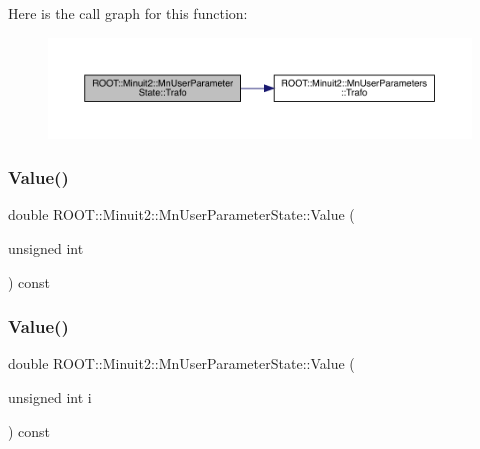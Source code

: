 Here is the call graph for this function\+:
\nopagebreak
\begin{figure}[H]
\begin{center}
\leavevmode
\includegraphics[width=350pt]{d3/de0/classROOT_1_1Minuit2_1_1MnUserParameterState_a7184e94a20e923d68f1fb00ab5c549b2_cgraph}
\end{center}
\end{figure}
\mbox{\label{classROOT_1_1Minuit2_1_1MnUserParameterState_a0f977953363899fd9ee8933b879cde3e}} 
\subsubsection{\texorpdfstring{Value()}{Value()}\hspace{0.1cm}{\footnotesize\ttfamily [1/4]}}
{\footnotesize\ttfamily double R\+O\+O\+T\+::\+Minuit2\+::\+Mn\+User\+Parameter\+State\+::\+Value (\begin{DoxyParamCaption}\item[{unsigned int}]{ }\end{DoxyParamCaption}) const}

\mbox{\label{classROOT_1_1Minuit2_1_1MnUserParameterState_a0f977953363899fd9ee8933b879cde3e}} 
\subsubsection{\texorpdfstring{Value()}{Value()}\hspace{0.1cm}{\footnotesize\ttfamily [2/4]}}
{\footnotesize\ttfamily double R\+O\+O\+T\+::\+Minuit2\+::\+Mn\+User\+Parameter\+State\+::\+Value (\begin{DoxyParamCaption}\item[{unsigned int}]{i }\end{DoxyParamCaption}) const}

